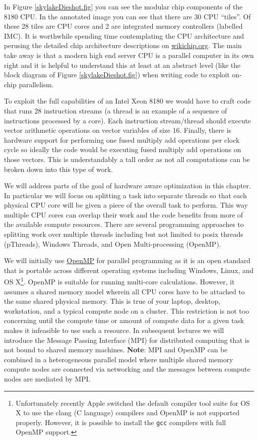 In Figure \ref{skylakeDieshot.fig} you can see the modular chip components of the 8180 CPU. In the annotated image you can see that there are 30 CPU ``tiles''. Of these 28 tiles are CPU cores and 2 are integrated memory controllers (labelled IMC). It is worthwhile spending time contemplating the CPU architecture and perusing the detailed chip architecture descriptions on \href{https://en.wikichip.org/wiki/intel/microarchitectures/skylake_(server)}{wikichip.org}. The main take away is that a modern high end server CPU is a parallel computer in its own right and it is helpful to understand this at least at an abstract level (like the block diagram of Figure  \ref{skylakeDieshot.fig}) when writing code to exploit on-chip parallelism.

To exploit the full capabilities of an Intel Xeon 8180 we would have to craft code that runs 28 instruction streams (a thread is an example of a sequence of instructions processed by a  core). Each instruction stream/thread should execute vector arithmetic operations on vector variables of size 16. Finally, there is hardware support for performing one fused multiply add operations per clock cycle so ideally the code would be executing fused multiply add operations on those vectors. This is understandably a tall order as not all computations can be broken down into this type of work. 

We will address parts of the goal of hardware aware optimization in this chapter. In particular we will focus on splitting a task into separate threads so that each physical CPU core will be given a piece of the overall task to perform. This way multiple CPU cores can overlap their work and the code benefits from more of the available compute resources. There are several programming approaches to splitting work over multiple threads including but not limited to posix threads (pThreads), Windows Threads, and Open Multi-processing (OpenMP). 

We will initially use \href{https://www.openmp.org/}{OpenMP} for parallel programming as it is an open standard that is portable across different operating systems  including Windows, Linux, and OS X\footnote{Unfortunately recently Apple switched the default compiler tool suite for OS X to use the clang (C language) compilers and OpenMP is not supported properly. However, it is possible to install the \texttt{gcc} compilers with full OpenMP support.}. OpenMP is suitable for running multi-core calculations. However, it assumes a shared memory model wherein all CPU cores have to be attached to the same shared physical memory. This is true of your laptop, desktop, workstation, and a typical compute node on a cluster. This restriction is not too concerning until the compute time or amount of compute data for a given task makes it infeasible to use such a resource. In subsequent lectures we will introduce the Message Passing Interface (MPI) for distributed computing that is not bound to shared memory machines. {\bf Note}: MPI and OpenMP can be combined in a heterogeneous parallel model where multiple shared memory compute nodes are connected via networking and the messages between compute nodes are mediated by MPI.

